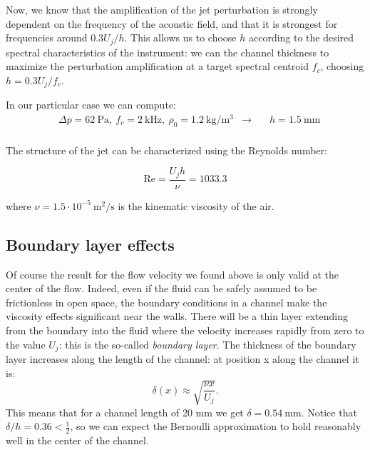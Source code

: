 \documentclass[a4paper]{article}
\begin{document}
Now, we know that the amplification of the jet perturbation is strongly dependent on the frequency of the acoustic field, and that it is strongest for frequencies around $0.3U_j / h$. This allows us to choose $h$ according to the desired spectral characteristics of the instrument: we can  the channel thickness to maximize the perturbation amplification at a target spectral centroid $f_c$, choosing $ h = 0.3 U_j / f_c$.

In our particular case we can compute:
\begin{align*}
		&\Delta p = \SI{62}{\pascal},~ f_c = \SI{2}{\kilo\hertz},~ \rho_0 = \SI{1.2}{\kilogram\per\meter\cubed} &\longrightarrow \quad &\boxed{h = \SI{1.5}{\milli\metre}}\\
\end{align*}

The structure of the jet can be characterized using the Reynolds number:

$$ \mathrm{Re} = \frac{U_j h}{\nu} = 1033.3 $$

where $\nu = 1.5 \cdot 10^{-5}~ \si{\meter\squared\per\second}$ is the kinematic viscosity of the air.

\subsection{Boundary layer effects}
Of course the result for the flow velocity we found above is only valid at the center of the flow. Indeed, even if the fluid can be safely assumed to be frictionless in open space, the boundary conditions in a channel make the viscosity effects significant near the walls. There will be a thin layer extending from the boundary into the fluid where the velocity increases rapidly from zero to the value $U_j$: this is the so-called \emph{boundary layer}. The thickness of the boundary layer increases along the length of the channel: at position x along the channel it is:
$$ \delta(x) \approx \sqrt{\frac{\nu x}{U_j}}. $$
This means that for a channel length of 20 mm we get $\delta = \SI{0.54}{\milli\meter}$. Notice that $\delta/h = 0.36 < \frac{1}{2}$, so we can expect the Bernoulli approximation to hold reasonably well in the center of the channel.
\end{document}

